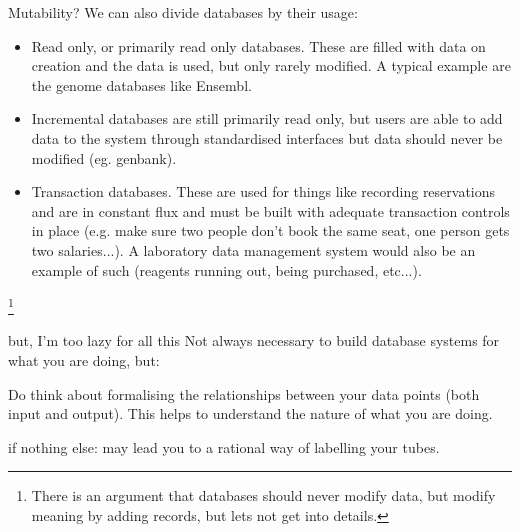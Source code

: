\documentclass[pdf]{beamer}
\newcommand\blfootnote[1]{%
  \begingroup  %
  \renewcommand\thefootnote{}\footnote{#1}%
  \addtocounter{footnote}{-1}  %
  \endgroup
}
\begin{document}
\begin{frame}{Mutability?}
  We can also divide databases by their usage:
  \begin{itemize}
  \item Read only, or primarily read only databases. These
    are filled with data on creation and the data is used, but
    only rarely modified. A typical example are the genome databases
    like Ensembl.
  \item Incremental databases are still primarily read only, but
    users are able to add data to the system through standardised
    interfaces but data should never be modified (eg. genbank).
  \item Transaction databases. These are used for things like recording
    reservations and are in constant flux and must be built with adequate
    transaction controls in place (e.g. make sure two people don't book
    the same seat, one person gets two salaries...). A laboratory data
    management system would also be an example of such (reagents running out,
    being purchased, etc...).
  \end{itemize}
  
  \blfootnote{There is an argument that databases should never modify data,
    but modify meaning by adding records, but lets not get into details.}
\end{frame}

\begin{frame}{but, I'm too lazy for all this}
  Not always necessary to build database systems for what you are doing, but:

  Do think about formalising the relationships between your data points (both
  input and output). This helps to understand the nature of what you are doing.

  if nothing else: may lead you to a rational way of labelling your tubes.
\end{frame}
\end{document}
